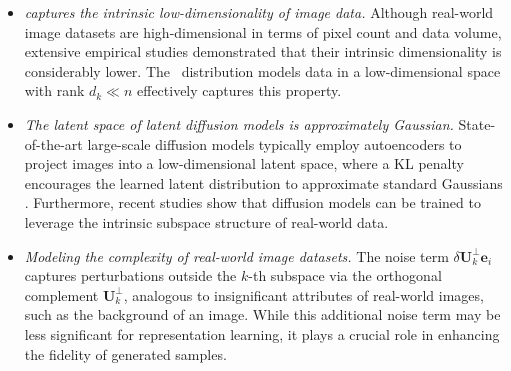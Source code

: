 \begin{itemize}[leftmargin=*]
    \vspace{-0.1in}
    \item \emph{\MoLRG\;captures the intrinsic low-dimensionality of image data.} Although real-world image datasets are high-dimensional in terms of pixel count and data volume, extensive empirical studies \citep{gong2019intrinsic,pope2021intrinsic,stanczuk2022your} demonstrated that their intrinsic dimensionality is considerably lower. The \MoLRG~distribution models data in a low-dimensional space with rank $d_k \ll n$ effectively captures this property.
    \item \emph{The latent space of latent diffusion models is approximately Gaussian.} State-of-the-art large-scale diffusion models \citep{peebles2023scalable, podell2023sdxl} typically employ autoencoders \citep{kingma2013auto} to project images into a low-dimensional latent space, where a KL penalty encourages the learned latent distribution to approximate standard Gaussians \citep{rombach2022high}. Furthermore, recent studies \citep{jing2022subspace, chen2024deconstructing} show that diffusion models can be trained to leverage the intrinsic subspace structure of real-world data.
    
    \item \emph{Modeling the complexity of real-world image datasets.} The noise term $\delta \bm U_k^{\perp} \bm e_i$ captures perturbations outside the $k$-th subspace via the orthogonal complement $\bm U_k^{\perp}$, analogous to insignificant attributes of real-world images, such as the background of an image. While this additional noise term may be less significant for representation learning, it plays a crucial role in enhancing the fidelity of generated samples. %
\end{itemize}

